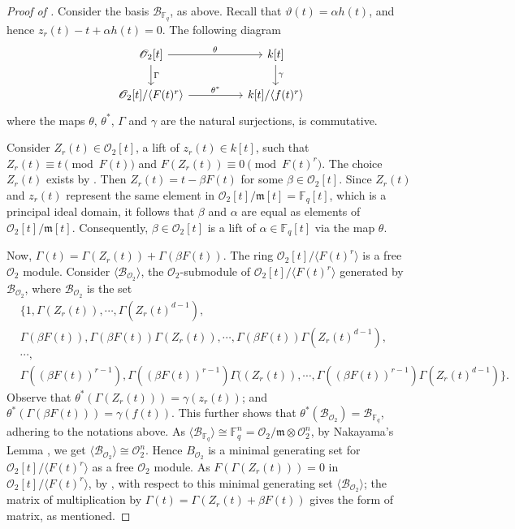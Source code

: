 \documentclass[11pt,twoside]{amsart}
\newcommand{\R}{\mathscr{O}_2}
\newcommand{\Fq}{\mathbb{F}_q}
\theoremstyle{definition} %
\begin{document}
\begin{proof}[Proof of ]
Consider the basis $\mathscr{B}_{\mathbb{F}_q}$, as above. 
Recall that $\vartheta(t)=\alpha h(t)$, and hence $z_r(t)-t+\alpha h(t)=0$. 
The following diagram
$$\begin{tikzcd}
	{\R[t]} && {k[t]} \\
	{\R[t]/\langle F(t)^r\rangle} && {k[t]/\langle f(t)^r\rangle}
	\arrow["{{\theta}}", from=1-1, to=1-3]
	\arrow["{\Gamma}", from=1-1, to=2-1]
	\arrow["{\gamma}", from=1-3, to=2-3]
	\arrow["{{\theta}^*}", from=2-1, to=2-3]
\end{tikzcd}$$
where the maps $\theta$, $\theta^*$, $\Gamma$ and $\gamma$ are the natural surjections, is commutative.

Consider $Z_r(t)\in \R[t]$, a lift of $z_r(t)\in k[t]$, such that $Z_r(t)\equiv t\pmod{F(t)}$ and $F(Z_r(t))\equiv 0\pmod{F(t)^r}$. 
The choice $Z_r(t)$ exists by .
Then $Z_r(t)=t-\beta F(t)$ for some $\beta\in\R[t]$.
Since $Z_r(t)$ and $z_r(t)$ represent the same element in $\R[t]/\mathfrak{m}[t] = \mathbb{F}_q[t]$, which is a principal ideal domain, it follows that $\beta$ and $\alpha$ are equal as elements of $\R[t]/\mathfrak{m}[t]$. Consequently, $\beta \in \R[t]$ is a lift of $\alpha \in \mathbb{F}_q[t]$ via the map $\theta$.
    
Now, $\Gamma(t)=\Gamma(Z_r(t))+\Gamma(\beta F(t))$. 
The ring $\R[t]/\langle F(t)^r\rangle$ is a free $\R$ module. 
Consider $\langle\mathscr{B}_{\R}\rangle$, the $\R$-submodule of $\R[t]/\langle F(t)^r\rangle$ generated by $\mathscr{B}_{\R}$, where $\mathscr{B}_{\R}$ is the set 
\begin{align*}
  &\{1, \Gamma(Z_r(t)),\cdots,\Gamma(Z_r(t)^{d-1}),\\  
  &\Gamma(\beta F(t)),\Gamma(\beta F(t))\Gamma({Z_r}(t)),\cdots,\Gamma(\beta F(t))\Gamma({Z_r}(t)^{d-1}),\\
  &\cdots,\\
  &\Gamma((\beta{F(t)})^{r-1}), \Gamma((\beta{F(t)})^{r-1})\Gamma(({Z_r}(t)),\cdots,\Gamma((\beta{F(t)})^{r-1})\Gamma({Z_r}(t)^{d-1})\}.
\end{align*}    
Observe that $\theta^*(\Gamma(Z_r(t)))=\gamma(z_r(t))$; and $\theta^*(\Gamma(\beta F(t)))=\gamma(f(t))$. 
This further shows that $\theta^*(\mathscr{B}_{\R})=\mathscr{B}_{\Fq}$, adhering to the notations above.
As $\langle\mathscr{B}_{\Fq}\rangle\cong \Fq^n={\R}/{\mathfrak{m}}\otimes \R^n$, by Nakayama's Lemma \cite[Proposition 2.8]{AtiyahMacBook69}, we get $\langle\mathscr{B}_{\R}\rangle \cong \R^n$. 
Hence ${B}_{\R}$ is a minimal generating set for $\R[t]/\langle F(t)^r\rangle$ as a free $\R$ module.
As $F(\Gamma(Z_r(t)))=0$ in $\R[t]/\langle F(t)^r\rangle$, by , with respect to this minimal generating set $\langle\mathscr{B}_{\R}\rangle$; the matrix of multiplication by $\Gamma(t)=\Gamma(Z_r(t)+\beta F(t))$ gives the form of matrix, as mentioned.
\end{proof}
\end{document}
